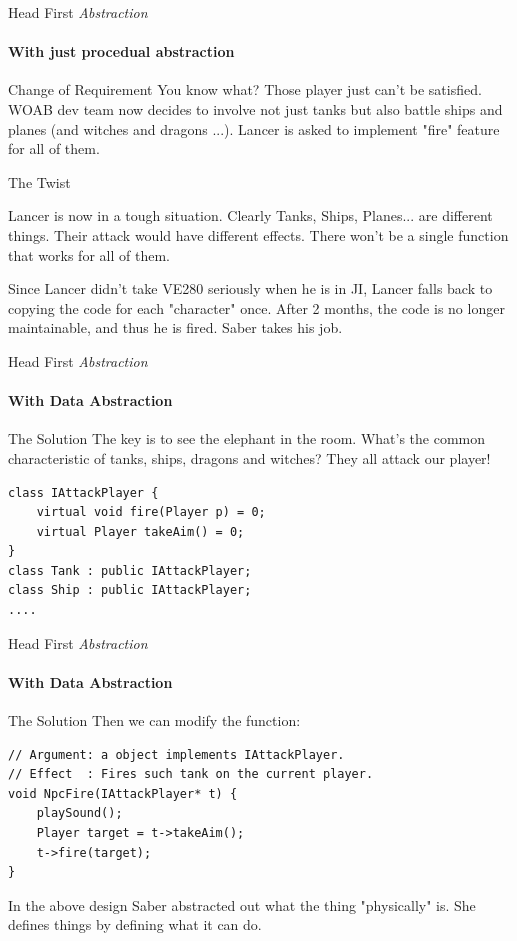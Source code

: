 \begin{frame}[fragile]{Head First \textit{Abstraction}}
\framesubtitle{With just procedual abstraction}
\begin{block}{Change of Requirement}
	\small{You know what? Those player just can't be satisfied. WOAB dev team now decides to involve not just tanks but also battle ships and planes (and witches and dragons ...). Lancer is asked to implement "fire" feature for all of them.}
\end{block}
\begin{block}{The Twist}
	\small{Lancer is now in a tough situation. Clearly Tanks, Ships, Planes... are different things. Their attack would have different effects. There won't be a single function that works for all of them.
	
	Since Lancer didn't take VE280 seriously when he is in JI, Lancer falls back to copying the code for each "character" once. After 2 months, the code is no longer maintainable, and thus he is fired. Saber takes his job.}
\end{block}
\end{frame}

\begin{frame}[fragile]{Head First \textit{Abstraction}}
\framesubtitle{With Data Abstraction}
\begin{block}{The Solution}
The key is to see the elephant in the room. What's the common characteristic of tanks, ships, dragons and witches? They all attack our player!
\begin{verbatim}
class IAttackPlayer {
    virtual void fire(Player p) = 0;
    virtual Player takeAim() = 0;
}
class Tank : public IAttackPlayer;
class Ship : public IAttackPlayer;
....
\end{verbatim}
\end{block}
\end{frame}

\begin{frame}[fragile]{Head First \textit{Abstraction}}
\framesubtitle{With Data Abstraction}
\begin{block}{The Solution}
	Then we can modify the function:
	\begin{verbatim}
// Argument: a object implements IAttackPlayer.
// Effect  : Fires such tank on the current player.
void NpcFire(IAttackPlayer* t) {
    playSound();
    Player target = t->takeAim(); 
    t->fire(target);
}
	\end{verbatim}
	In the above design Saber abstracted out what the thing "physically" is. She defines things by defining what it can do.
\end{block}
\end{frame}

